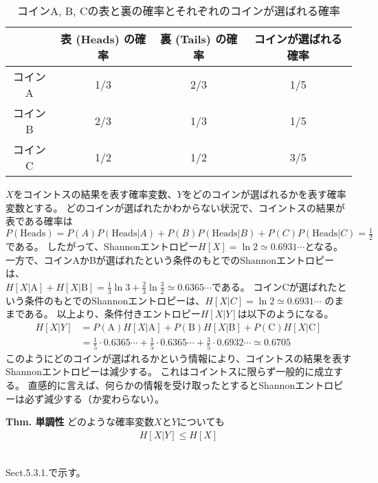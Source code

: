\documentclass[a4paper,11pt]{jsarticle}
\begin{document}
\begin{table}[H]
  \centering
  \begin{tabular}{|c|c|c|c|}
  \hline
         & 表 (Heads) の確率 & 裏 (Tails) の確率 & コインが選ばれる確率 \\ \hline
  コインA & 1/3 & 2/3 & 1/5 \\ \hline
  コインB & 2/3 & 1/3 & 1/5 \\ \hline
  コインC & 1/2 & 1/2 & 3/5 \\ \hline
  \end{tabular}
  \caption{コインA, B, Cの表と裏の確率とそれぞれのコインが選ばれる確率}
  \label{table:coins}
\end{table}

$X$をコイントスの結果を表す確率変数、$Y$をどのコインが選ばれるかを表す確率変数とする。
どのコインが選ばれたかわからない状況で、コイントスの結果が表である確率は\\
$P(\mathrm{Heads}) = P(A) P(\mathrm{Heads}|A) + P(B) P(\mathrm{Heads}|B) + P(C) P(\mathrm{Heads}|C) = \frac{1}{2}$である。
したがって、Shannonエントロピー$H[X]=\ln{2} \simeq 0.6931 \cdots$となる。\\
一方で、コインAかBが選ばれたという条件のもとでのShannonエントロピーは、\\
$H[X|\mathrm{A}] + H[X|\mathrm{B}] = \frac{1}{3} \ln{3} +\frac{2}{3} \ln{\frac{3}{2}} \simeq 0.6365 \cdots$である。
コインCが選ばれたという条件のもとでのShannonエントロピーは、$H[X|C] = \ln{2} \simeq 0.6931 \cdots$ のままである。
以上より、条件付きエントロピー$H[X|Y]$は以下のようになる。
\begin{align}
  H[X|Y] &= P(\mathrm{A})H[X|\mathrm{A}] + P(\mathrm{B})H[X|\mathrm{B}] + P(\mathrm{C})H[X|\mathrm{C}]\\
  &= \frac{1}{5} \cdot 0.6365 \cdots + \frac{1}{5} \cdot 0.6365 \cdots + \frac{3}{5} \cdot 0.6932 \cdots \simeq 0.6705
\end{align}
このようにどのコインが選ばれるかという情報により、コイントスの結果を表すShannonエントロピーは減少する。
これはコイントスに限らず一般的に成立する。
直感的に言えば、何らかの情報を受け取ったとするとShannonエントロピーは必ず減少する（か変わらない）。
\begin{itembox}[l]{\textbf{Thm. 単調性}}
  どのような確率変数$X$と$Y$についても
  \begin{align}
    H[X|Y] \leq H[X]
  \end{align}
\end{itembox}

\\
Sect.5.3.1.で示す。
\end{document}
